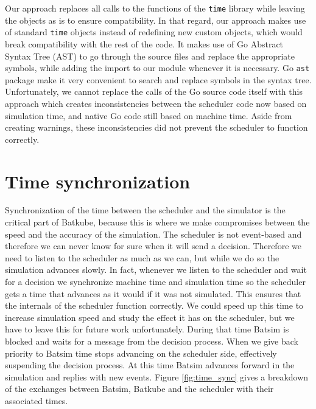 Our approach replaces all calls to the functions of the \texttt{time} library
while leaving the objects as is to ensure compatibility. In that regard, our
approach makes use of standard \texttt{time} objects instead of redefining new
custom objects, which would break compatibility with the rest of the code. It
makes use of Go Abstract Syntax Tree (AST) to go through the source files and
replace the appropriate symbols, while adding the import to our module whenever
it is necessary. Go \texttt{ast} package make it very convenient to search and
replace symbols in the syntax tree.  Unfortunately, we cannot replace the calls
of the Go source code itself with this approach which creates inconsistencies
between the scheduler code now based on simulation time, and native Go code
still based on machine time. Aside from creating warnings, these
inconsistencies did not prevent the scheduler to function correctly.

\section{Time synchronization}

Synchronization of the time between the scheduler and the simulator is the
critical part of Batkube, because this is where we make compromises between the
speed and the accuracy of the simulation. The scheduler is not event-based and
therefore we can never know for sure when it will send a decision. Therefore we
need to listen to the scheduler as much as we can, but while we do so the
simulation advances slowly. In fact, whenever we listen to the scheduler and
wait for a decision we synchronize machine time and simulation time so the
scheduler gets a time that advances as it would if it was not simulated. This
ensures that the internals of the scheduler function correctly. We could speed
up this time to increase simulation speed and study the effect it has on the
scheduler, but we have to leave this for future work unfortunately. During that
time Batsim is blocked and waits for a message from the decision process. When
we give back priority to Batsim time stops advancing on the scheduler side,
effectively suspending the decision process. At this time Batsim advances
forward in the simulation and replies with new events. Figure
\ref{fig:time_sync} gives a breakdown of the exchanges between Batsim, Batkube
and the scheduler with their associated times.\\

